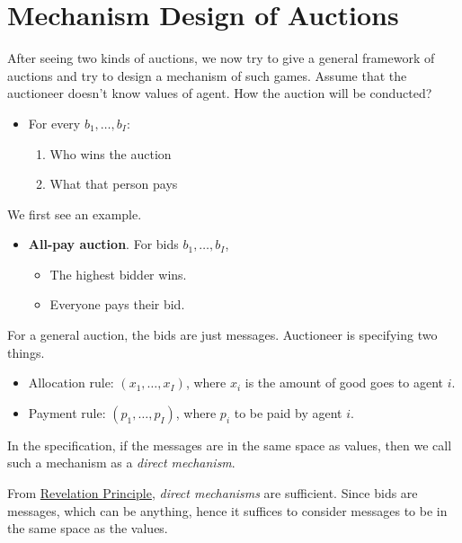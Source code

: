 \section{Mechanism Design of Auctions}
After seeing two kinds of auctions, we now try to give a general framework of auctions and try to design a mechanism of such games.
Assume that the auctioneer doesn't know values of agent. How the auction will be conducted?
\begin{itemize}
	\item For every \(b_1, \ldots , b_I\):
	      \begin{enumerate}
		      \item Who wins the auction
		      \item What that person pays
	      \end{enumerate}
\end{itemize}

\begin{eg}
	We first see an example.
	\begin{itemize}
		\item \textbf{All-pay auction}. For bids \(b_1, \ldots , b_I\),
		      \begin{itemize}
			      \item The highest bidder wins.
			      \item Everyone pays their bid.
		      \end{itemize}
	\end{itemize}
\end{eg}

For a general auction, the bids are just messages. Auctioneer is specifying two things.
\begin{itemize}
	\item Allocation rule: \((x_1, \ldots , x_I)\), where \(x_{i}\) is the amount of good goes to agent \(i\).
	\item Payment rule: \((p_1, \ldots , p_I)\), where \(p_{i}\) to be paid by agent \(i\).
\end{itemize}

\begin{definition}
	In the specification, if the messages are in the same space as values, then we call such a mechanism as a \emph{direct mechanism}.
\end{definition}

\begin{prev}
	From \hyperref[Revelation-Principle]{Revelation Principle}, \emph{direct mechanisms} are sufficient. Since bids are messages, which can be anything, hence
	it suffices to consider messages to be in the same space as the values.
\end{prev}

